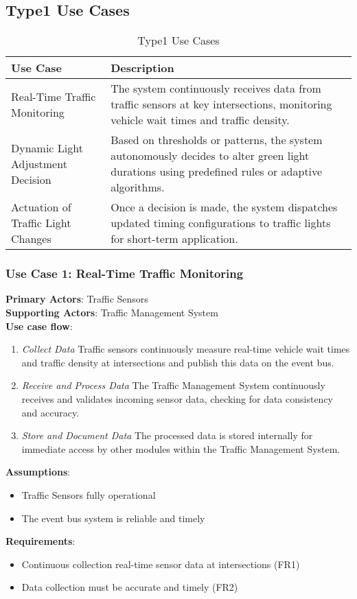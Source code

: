 \documentclass[a4paper,12pt]{article}
\begin{document}
\subsection*{Type1 Use Cases}
\begin{table}[h!]
\centering
\begin{tabular}{|p{4.5cm}|p{8.5cm}|}
\hline
\textbf{Use Case} & \textbf{Description} \\
\hline
Real-Time Traffic Monitoring & The system continuously receives data from traffic sensors at key intersections, monitoring vehicle wait times and traffic density. \\
\hline
Dynamic Light Adjustment Decision & Based on thresholds or patterns, the system autonomously decides to alter green light durations using predefined rules or adaptive algorithms. \\
\hline
Actuation of Traffic Light Changes & Once a decision is made, the system dispatches updated timing configurations to traffic lights for short-term application. \\
\hline
\end{tabular}
\caption{Type1 Use Cases}
\end{table}

\subsubsection*{Use Case 1: Real-Time Traffic Monitoring}
\textbf{Primary Actors}: Traffic Sensors \\
\textbf{Supporting Actors}: Traffic Management System \\
\textbf{Use case flow}: 
\begin{enumerate}
    \item \textit{Collect Data} Traffic sensors continuously measure real-time vehicle wait times and traffic density at intersections and publish this data on the event bus.
    \item \textit{Receive and Process Data} The Traffic Management System continuously receives and validates incoming sensor data, checking for data consistency and accuracy.
    \item \textit{Store and Document Data} The processed data is stored internally for immediate access by other modules within the Traffic Management System.
\end{enumerate}
\textbf{Assumptions}: 
\begin{itemize}
    \item Traffic Sensors  fully operational
    \item The event bus system is reliable and timely \\
\end{itemize}
\textbf{Requirements}: 
\begin{itemize}
    \item Continuous collection real-time sensor  data at intersections (FR1)
    \item Data collection must be accurate and timely (FR2)
\end{itemize} 
\end{document}
